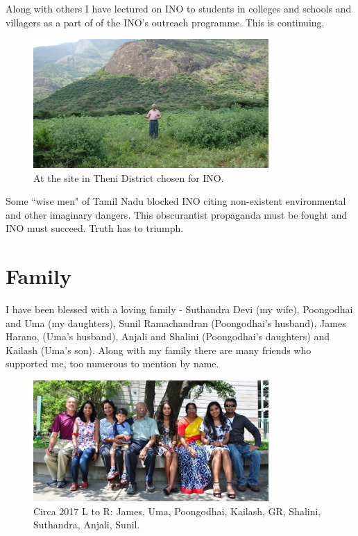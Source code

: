 Along with others I have lectured on INO to students in colleges and 
schools and villagers as a part of of the INO's outreach programme. This 
is continuing.

\begin{figure}[h]
\centering
\includegraphics[width=0.8\textwidth]{images/Rajaji-ino.jpg}
\caption{\small{At the site in Theni District chosen for INO.}}
\end{figure}
  
Some ``wise men" of Tamil Nadu blocked INO citing non-exi\-stent 
environmental and other imaginary dangers. This obscurantist propaganda 
must be fought and INO must succeed. Truth has to triumph.


\vspace{-.3cm}

\section*{Family}

\vspace{-.2cm}

I have been blessed with a loving family - Suthandra Devi (my wife), 
Poongodhai and Uma (my daughters), Sunil Ramachandran (Poongodhai's 
husband), James Harano, (Uma's husband), Anjali and Shalini 
(Poongodhai's daughters) and Kailash (Uma's son).
Along with my family there are many friends who suppo\-rted me, too 
numerous to mention by name.


\begin{figure}[h]
\centering
\includegraphics[width=0.8\textwidth]{images/Rajaji-family-1.jpg}
\caption{\small{Circa 2017 L to R: James, Uma, Poongodhai, Kailash, GR, Shalini, Suthandra, Anjali, Sunil.}}
\end{figure}

